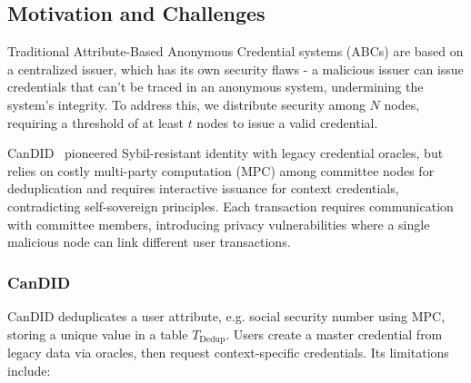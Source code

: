 \subsection{Motivation and Challenges}

Traditional Attribute-Based Anonymous Credential systems (ABCs) are based on a centralized issuer, which has its own security flaws - a malicious issuer can issue credentials that can't be traced in an anonymous system, undermining the system's integrity. To address this, we distribute security among $N$ nodes, requiring a threshold of at least $t$ nodes to issue a valid credential. 

CanDID~\cite{maram_candid_2020} pioneered Sybil-resistant identity with legacy credential oracles, but relies on costly multi-party computation (MPC) among committee nodes for deduplication and requires interactive issuance for context credentials, contradicting self-sovereign principles. Each transaction requires communication with committee members, introducing privacy vulnerabilities where a single malicious node can link different user transactions.

\subsubsection*{CanDID}
CanDID deduplicates a user attribute, e.g. social security number using MPC, storing a unique value in a table $T_{\text{Dedup}}$. Users create a master credential from legacy data via oracles, then request context-specific credentials. Its limitations include:

